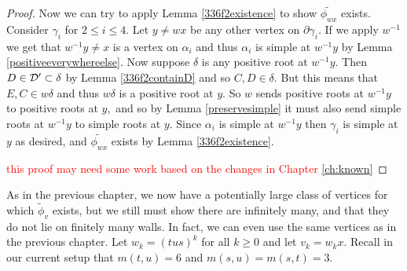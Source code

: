 \documentclass[class=book, crop=false]{standalone}
\begin{document}
\begin{proof}
Now we can try to apply Lemma \ref{336f2existence} to show $\tilde{\phi_{wx}}$ exists. Consider $\gamma_i$ for $2\le i\le 4.$ Let $y\neq wx$ be any other vertex on $\partial\gamma_i.$ If we apply $w^{-1}$ we get that $w^{-1}y\neq x$ is a vertex on $\alpha_i$ and thus $\alpha_i$ is simple at $w^{-1}y$ by Lemma \ref{positiveeverywhereelse}. Now suppose $\delta$ is any positive root at $w^{-1}y.$ Then $D\in \mathcal{D}'\subset \delta$ by Lemma \ref{336f2containD} and so $C,D\in \delta.$ But this means that $E,C\in w\delta$ and thus $w\delta$ is a positive root at $y.$ So $w$ sends positive roots at $w^{-1}y$ to positive roots at $y,$ and so by Lemma \ref{preservesimple} it must also send simple roots at $w^{-1}y$ to simple roots at $y.$ Since $\alpha_i$ is simple at $w^{-1}y$ then $\gamma_i$ is simple at $y$ as desired, and $\tilde{\phi_{wx}}$ exists by Lemma \ref{336f2existence}.

\textcolor{red}{this proof may need some work based on the changes in Chapter \ref{ch:known}}
\end{proof}

As in the previous chapter, we now have a potentially large class of vertices for which $\tilde{\phi}_v$ exists, but we still must show there are infinitely many, and that they do not lie on finitely many walls. In fact, we can even use the same vertices as in the previous chapter. Let $w_k=(tus)^k$ for all $k\ge 0$ and let $v_k=w_kx.$ Recall in our current setup that $m(t,u)=6$ and $m(s,u)=m(s,t)=3.$ 
\end{document}
